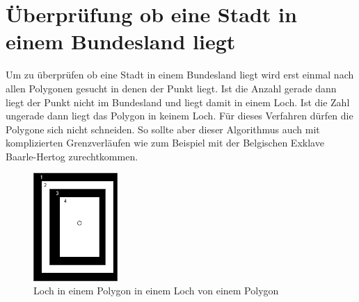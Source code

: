 \documentclass[conference]{IEEEtran}
\begin{document}
	\vspace{1cm}
	\section{Überprüfung ob eine Stadt in einem Bundesland liegt}
	Um zu überprüfen ob eine Stadt in einem Bundesland liegt wird erst einmal nach allen Polygonen gesucht in denen der Punkt liegt. Ist die Anzahl gerade dann liegt der Punkt nicht im Bundesland und liegt damit in einem Loch. Ist die Zahl ungerade dann liegt das Polygon in keinem Loch. Für dieses Verfahren dürfen die Polygone sich nicht schneiden. So sollte aber dieser Algorithmus auch mit komplizierten Grenzverläufen wie zum Beispiel mit der Belgischen Exklave Baarle-Hertog zurechtkommen.
	\begin{figure}[h]
		\begin{center}
			\includegraphics[width=3.2cm]{StadtInBundesland.png}
			\caption{Loch in einem Polygon in einem Loch von einem Polygon}
			\label{	StadtInBundesland}
		\end{center}
	\end{figure}\\
\end{document}
